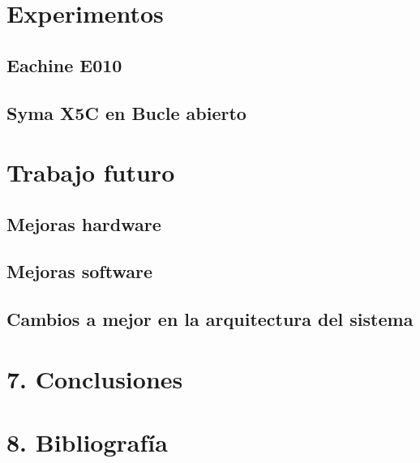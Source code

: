 \documentclass[10pt]{article}
\begin{document}
\section{Experimentos}
	\subsection{Eachine E010}
	\subsection{Syma X5C en Bucle abierto}
	
	
\section{Trabajo futuro}
	\subsection{Mejoras hardware}
	\subsection{Mejoras software}
	\subsection{Cambios a mejor en la arquitectura del sistema}
	
	
\section{7.	Conclusiones}

\section{8.	Bibliografía}
\end{document}
